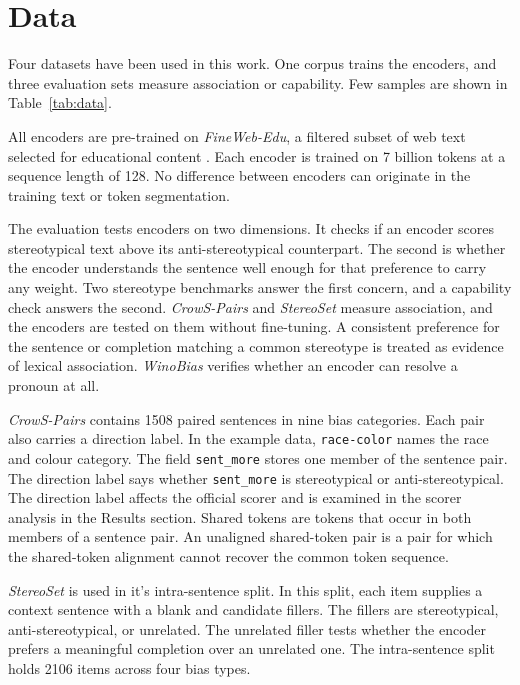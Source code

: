 \documentclass[sigconf,natbib=true,anonymous=true]{acmart}
\begin{document}
\section{Data}
\label{sec:data}

Four datasets have been used in this work. One corpus trains the encoders, and three evaluation sets measure association or capability. Few samples are shown in Table~\ref{tab:data}.

All encoders are pre-trained on \emph{FineWeb-Edu}, a
filtered subset of web text selected for educational content
\citep{penedo2024fineweb}. Each encoder is trained on 7 billion tokens at a sequence
length of 128. No difference between encoders can originate
in the training text or token segmentation.

The evaluation tests encoders on two dimensions. It checks if an encoder scores
stereotypical text above its anti-stereotypical counterpart. The second is
whether the encoder understands the sentence well enough for that preference to
carry any weight. Two stereotype benchmarks answer the first concern, and a
capability check answers the second. \emph{CrowS-Pairs} and \emph{StereoSet}
measure association, and the encoders are tested on them without fine-tuning. A
consistent preference for the sentence or completion matching a common
stereotype is treated as evidence of lexical association. \emph{WinoBias} verifies
whether an encoder can resolve a pronoun at all.

\emph{CrowS-Pairs} contains 1508 paired sentences in nine bias categories. Each
pair also carries a direction label. In the example data, \texttt{race-color}
names the race and colour category. The field \texttt{sent\_more} stores one
member of the sentence pair. The direction label says whether
\texttt{sent\_more} is stereotypical or anti-stereotypical. The direction label
affects the official scorer and is examined in the scorer analysis in the Results section. Shared tokens are tokens that occur in both members of a sentence pair. An unaligned shared-token pair is a pair for which the shared-token alignment cannot recover the common token sequence. 

\emph{StereoSet} is used in it's intra-sentence split. In this split, each item
supplies a context sentence with a blank and candidate fillers. The fillers are
stereotypical, anti-stereotypical, or unrelated. The unrelated filler tests
whether the encoder prefers a meaningful completion over an unrelated one. The
intra-sentence split holds 2106 items across four bias types.
\end{document}
